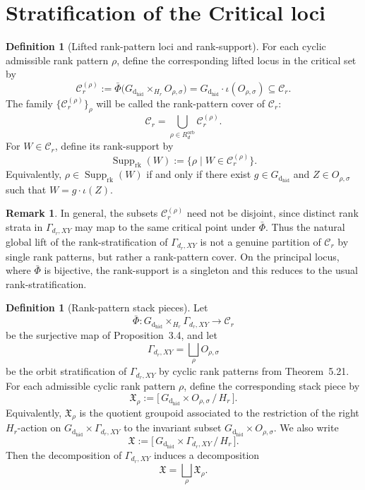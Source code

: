 \documentclass{article}
\newcommand{\dhid}{\operatorname{d_{hid}}}
\theoremstyle{definition}
\newtheorem{definition}[theorem]{Definition}
\newtheorem{remark}[theorem]{Remark}
\begin{document}
\section{Stratification of the Critical loci}
\begin{definition}[Lifted rank-pattern loci and rank-support]
For each cyclic admissible rank pattern $\rho$, define the corresponding lifted locus in the critical set by
\[
\mathcal C_r^{(\rho)}
:=
\bar\Phi\!\bigl(G_{\dhid}\times_{H_{r}} O_{\rho,\sigma}\bigr)
=
G_{\dhid}\cdot \iota(O_{\rho,\sigma}) \subseteq \mathcal C_r.
\]
The family $\{\mathcal C_r^{(\rho)}\}_\rho$ will be called the rank-pattern cover of $\mathcal C_r$:
\begin{equation*}
\mathcal C_r = \bigcup_{\rho\in R_d^{\mathrm{orb}}} \mathcal C_r^{(\rho)}.
\end{equation*}
\noindent
For $W\in \mathcal C_r$, define its rank-support by
\[
\operatorname{Supp}_{\mathrm{rk}}(W)
:=
\{\rho \mid W\in \mathcal C_r^{(\rho)}\}.
\]
Equivalently, $\rho\in \operatorname{Supp}_{\mathrm{rk}}(W)$ if and only if there exist
$g\in G_{\dhid}$ and $Z\in O_{\rho,\sigma}$ such that $W=g\cdot \iota(Z)$.
\end{definition}

\begin{remark}
In general, the subsets $\mathcal C_r^{(\rho)}$ need not be disjoint, since distinct rank strata in
$\Gamma_{d_r,XY}$ may map to the same critical point under $\bar\Phi$. Thus the natural global lift of the
rank-stratification of $\Gamma_{d_r,XY}$ is not a genuine partition of $\mathcal C_r$ by single rank patterns,
but rather a rank-pattern cover. On the principal locus, where $\bar\Phi$ is bijective, the rank-support is a singleton and this reduces to the
usual rank-stratification.
\end{remark}
\begin{definition}[Rank-pattern stack pieces]
Let
\[
\bar\Phi \colon G_{\dhid} \times_{H_{r}} \Gamma_{d_r,XY} \longrightarrow \mathcal C_r
\]
be the surjective map of Proposition~3.4, and let
\[
\Gamma_{d_r,XY}
=
\bigsqcup_{\rho} O_{\rho,\sigma}
\]
be the orbit stratification of $\Gamma_{d_r,XY}$ by cyclic rank patterns from Theorem~5.21.
\noindent
For each admissible cyclic rank pattern $\rho$, define the corresponding stack piece by
\[
\mathfrak X_\rho
:=
\bigl[\,G_{\dhid} \times O_{\rho,\sigma}\,/\,H_{r}\,\bigr].
\]
Equivalently, $\mathfrak X_\rho$ is the quotient groupoid associated to the restriction of the
right $H_{r}$-action on $G_{\dhid}\times \Gamma_{d_r,XY}$ to the invariant subset
$G_{\dhid}\times O_{\rho,\sigma}$.
\noindent
We also write
\[
\mathfrak X
:=
\bigl[\,G_{\dhid} \times \Gamma_{d_r,XY}\,/\,H_{r}\,\bigr].
\]
Then the decomposition of $\Gamma_{d_r,XY}$ induces a decomposition
\[
\mathfrak X
=
\bigsqcup_{\rho}\mathfrak X_\rho.
\]
\end{definition}
\end{document}
